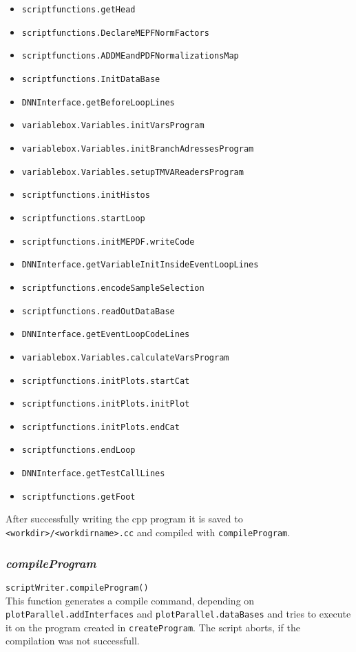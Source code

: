 \documentclass[12pt, a4paper]{article}
\begin{document}
\begin{itemize}
\itemsep-0.5em
\item \texttt{scriptfunctions.getHead}
\item \texttt{scriptfunctions.DeclareMEPFNormFactors}
\item \texttt{scriptfunctions.ADDMEandPDFNormalizationsMap}
\item \texttt{scriptfunctions.InitDataBase}
\item \texttt{DNNInterface.getBeforeLoopLines}
\item \texttt{variablebox.Variables.initVarsProgram}
\item \texttt{variablebox.Variables.initBranchAdressesProgram}
\item \texttt{variablebox.Variables.setupTMVAReadersProgram}
\item \texttt{scriptfunctions.initHistos}
\item \texttt{scriptfunctions.startLoop}
\item \texttt{scriptfunctions.initMEPDF.writeCode}
\item \texttt{DNNInterface.getVariableInitInsideEventLoopLines}
\item \texttt{scriptfunctions.encodeSampleSelection}
\item \texttt{scriptfunctions.readOutDataBase}
\item \texttt{DNNInterface.getEventLoopCodeLines}
\item \texttt{variablebox.Variables.calculateVarsProgram}
\item \texttt{scriptfunctions.initPlots.startCat}
\item \texttt{scriptfunctions.initPlots.initPlot}
\item \texttt{scriptfunctions.initPlots.endCat}
\item \texttt{scriptfunctions.endLoop}
\item \texttt{DNNInterface.getTestCallLines}
\item \texttt{scriptfunctions.getFoot}
\end{itemize}
After successfully writing the cpp program it is saved to \texttt{<workdir>/<workdirname>.cc} and compiled with \texttt{compileProgram}.


\subsubsection{\textit{compileProgram}}
\texttt{scriptWriter.compileProgram()}\\
This function generates a compile command, depending on \texttt{plotParallel.addInterfaces} and \texttt{plotParallel.dataBases} and tries to execute it on the program created in \texttt{createProgram}. The script aborts, if the compilation was not successfull.
\end{document}
